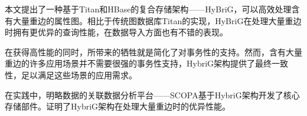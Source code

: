 
本文提出了一种基于Titan和HBase的复合存储架构——HyBriG，可以高效处理含有大量重边的属性图。相比于传统图数据库Titan的实现，HyBriG在处理大量重边时拥有更优异的查询性能，在数据导入方面也有不错的表现。

在获得高性能的同时，所带来的牺牲就是简化了对事务性的支持。然而，含有大量重边的许多应用场景并不需要很强的事务性支持，HybriG架构提供了最终一致性，足以满足这些场景的应用需求。

在实践中，明略数据的关联数据分析平台——SCOPA基于HybriG架构开发了核心存储部件。证明了HybriG架构在处理大量重边时的优异性能。


